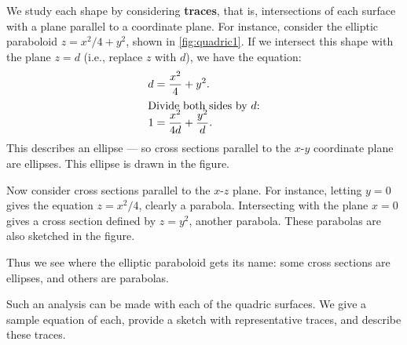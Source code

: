 We study each shape by considering
\textbf{traces},
that is, intersections of each surface with a plane parallel to a coordinate plane. For instance, consider the elliptic paraboloid $z= x^2/4+y^2$, shown in \autoref{fig:quadric1}. If we intersect this shape with the plane $z=d$ (i.e., replace $z$ with $d$), we have the equation:
\begin{align*}
d &= \frac{x^2}4+y^2.\\
\intertext{Divide both sides by \intertextmath{d}:\vspace{-.5\baselineskip}}
1 &= \frac{x^2}{4d} + \frac{y^2}{d}.
\end{align*}
This describes an ellipse --- so cross sections parallel to the $x$-$y$ coordinate plane are ellipses. This ellipse is drawn in the figure.

Now consider cross sections parallel to the $x$-$z$ plane. For instance, letting $y=0$ gives the equation $z=x^2/4$, clearly a parabola. Intersecting with the plane $x=0$ gives a cross section defined by $z=y^2$, another parabola. These parabolas are also sketched in the figure. 

Thus we see where the elliptic paraboloid gets its name: some cross sections are ellipses, and others are parabolas.

Such an analysis can be made with each of the quadric surfaces. We give a sample equation of each, provide a sketch with representative traces, and describe these traces.

\exercisegeometry
\pagestyle{exercise}

